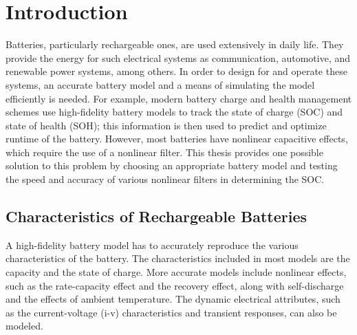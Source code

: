 \chapter{Introduction}

Batteries, particularly rechargeable ones, are used extensively in daily life. They provide the energy for such electrical systems as communication, automotive, and renewable power systems, among others. In order to design for and operate these systems, an accurate battery model and a means of simulating the model efficiently is needed. For example, modern battery charge and health management schemes use high-fidelity battery models to track the state of charge (SOC) and state of health (SOH); this information is then used to predict and optimize runtime of the battery. However, most batteries have nonlinear capacitive effects, which require the use of a nonlinear filter. This thesis provides one possible solution to this problem by choosing an appropriate battery model and testing the speed and accuracy of various nonlinear filters in determining the SOC.


\section{Characteristics of Rechargeable Batteries}

A high-fidelity battery model has to accurately reproduce the various characteristics of the battery. The characteristics included in most models are the capacity and the state of charge. More accurate models include nonlinear effects, such as the rate-capacity effect and the recovery effect, along with self-discharge and the effects of ambient temperature. The dynamic electrical attributes, such as the current-voltage (i-v) characteristics and transient responses, can also be modeled.


